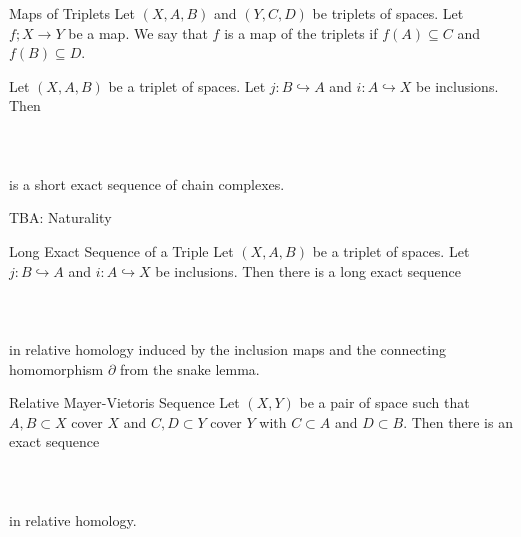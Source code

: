 \documentclass[a4paper]{article}
\begin{document}
\begin{defn}{Maps of Triplets}{} Let $(X,A,B)$ and $(Y,C,D)$ be triplets of spaces. Let $f;X\to Y$ be a map. We say that $f$ is a map of the triplets if $f(A)\subseteq C$ and $f(B)\subseteq D$. 
\end{defn}

\begin{prp}{}{} Let $(X,A,B)$ be a triplet of spaces. Let $j:B\hookrightarrow A$ and $i:A\hookrightarrow X$ be inclusions. Then \\~\\
\\~\\
is a short exact sequence of chain complexes. 
\end{prp}

TBA: Naturality

\begin{prp}{Long Exact Sequence of a Triple}{} Let $(X,A,B)$ be a triplet of spaces. Let $j:B\hookrightarrow A$ and $i:A\hookrightarrow X$ be inclusions. Then there is a long exact sequence \\~\\
\\~\\
in relative homology induced by the inclusion maps and the connecting homomorphism $\partial$ from the snake lemma. 
\end{prp}

\begin{thm}{Relative Mayer-Vietoris Sequence}{} Let $(X,Y)$ be a pair of space such that $A,B\subset X$ cover $X$ and $C,D\subset Y$ cover $Y$ with $C\subset A$ and $D\subset B$. Then there is an exact sequence \\~\\
\\~\\
in relative homology. 
\end{thm}
\end{document}
